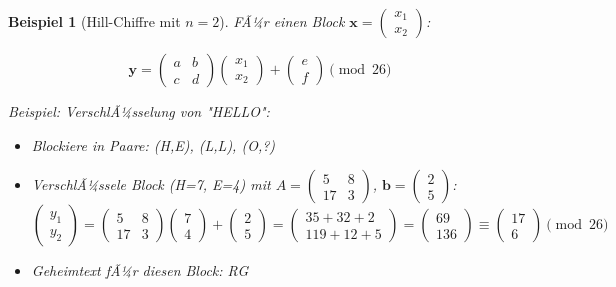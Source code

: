 ﻿\documentclass[12pt,a4paper]{article}
\newtheorem{example}{Beispiel}
\begin{document}
	\begin{example}[Hill-Chiffre mit $n=2$]
		FÃ¼r einen Block $\mathbf{x} = \begin{pmatrix} x_1 \\ x_2 \end{pmatrix}$:
		
		\begin{equation}
			\mathbf{y} = \begin{pmatrix} a & b \\ c & d \end{pmatrix} \begin{pmatrix} x_1 \\ x_2 \end{pmatrix} + \begin{pmatrix} e \\ f \end{pmatrix} \pmod{26}
		\end{equation}
		
		Beispiel: VerschlÃ¼sselung von "HELLO":
		\begin{itemize}
			\item Blockiere in Paare: (H,E), (L,L), (O,?)
			\item VerschlÃ¼ssele Block (H=7, E=4) mit $A = \begin{pmatrix} 5 & 8 \\ 17 & 3 \end{pmatrix}$, $\mathbf{b} = \begin{pmatrix} 2 \\ 5 \end{pmatrix}$:
			\begin{equation}
				\begin{pmatrix} y_1 \\ y_2 \end{pmatrix} = \begin{pmatrix} 5 & 8 \\ 17 & 3 \end{pmatrix} \begin{pmatrix} 7 \\ 4 \end{pmatrix} + \begin{pmatrix} 2 \\ 5 \end{pmatrix} = \begin{pmatrix} 35 + 32 + 2 \\ 119 + 12 + 5 \end{pmatrix} = \begin{pmatrix} 69 \\ 136 \end{pmatrix} \equiv \begin{pmatrix} 17 \\ 6 \end{pmatrix} \pmod{26}
			\end{equation}
			\item Geheimtext fÃ¼r diesen Block: RG
		\end{itemize}
	\end{example}
	
\end{document}
